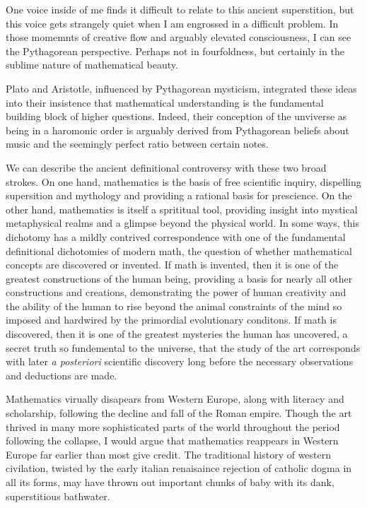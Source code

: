 \documentclass[12pt]{article}
\begin{document}
One voice inside of me finds it difficult to relate
to this ancient superstition,
but this voice gets strangely quiet
when I am engrossed in a difficult problem.
In those momemnts of creative flow
and arguably elevated consciousness,
I can see the Pythagorean perspective.
Perhaps not in fourfoldness,
but certainly in the sublime nature of mathematical beauty.

Plato and Aristotle,
influenced by Pythagorean mysticism,
integrated these ideas
into their insistence that mathematical understanding 
is the fundamental building block of higher questions.
Indeed, their conception of the unviverse as
being in a haromonic order is arguably derived from
Pythagorean beliefs about music
and the seemingly perfect ratio between certain notes.

We can describe the ancient definitional controversy
with these two broad strokes.
On one hand, mathematics is the basis of free scientific inquiry,
dispelling supersition and mythology
and providing a rational basis for prescience.
On the other hand, mathematics is itself a sprititual tool,
providing insight into mystical metaphysical realms
and a glimpse beyond the physical world.
In some ways,
this dichotomy
has a mildly contrived correspondence with one of
the fundamental definitional dichotomies
of modern math,
the question of whether mathematical concepts
are discovered or invented.
If math is invented,
then it is one of the greatest constructions of the human being,
providing a basis for nearly all other constructions and creations,
demonstrating the power of human creativity
and the ability of the human to rise beyond the animal constraints of the mind
so imposed and hardwired by the primordial evolutionary conditons.
If math is discovered,
then it is one of the greatest mysteries the human has uncovered,
a secret truth so fundemental to the universe,
that the study of the art corresponds
with later \textit{a posteriori} scientific discovery
long before the necessary observations and deductions are made.

Mathematics virually disapears from Western Europe,
along with literacy and scholarship,
following the decline and fall of the Roman empire.
Though the art thrived in many more sophisticated
parts of the world throughout the period
following the collapse,
I would argue that mathematics reappears in Western Europe
far earlier than most give credit.
The traditional history of western civilation,
twisted by the early italian renaisaince rejection
of catholic dogma in all its forms,
may have thrown out important chunks of baby
with its dank, superstitious bathwater.
\end{document}
